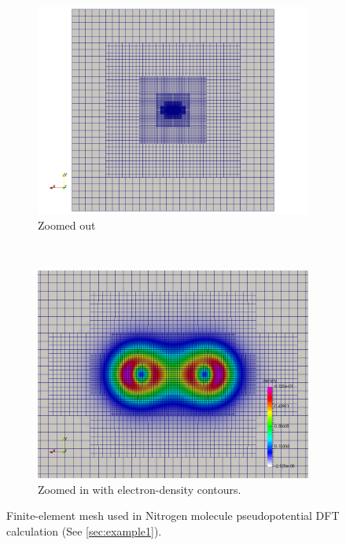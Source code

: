 \begin{figure}
\centering
\begin{subfigure}{\textwidth}
  \centering
  \includegraphics[width=.7\linewidth]{zoomedOutDemo1.png}
  \caption{Zoomed out}
  \label{fig:sub1}
\end{subfigure}%
\\
\begin{subfigure}{\textwidth}
  \centering
  \includegraphics[width=.6\linewidth]{zoomedInDemo1.png}
  \caption{Zoomed in with electron-density contours.}
  \label{fig:sub2}
\end{subfigure}
	\caption{Finite-element mesh used in Nitrogen molecule pseudopotential DFT calculation (See \ref{sec:example1}).}
\label{fig:N2}
\end{figure}

